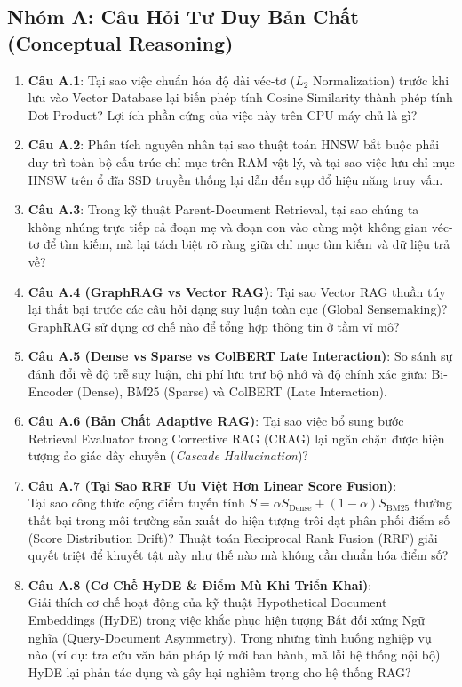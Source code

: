 \subsection{Nhóm A: Câu Hỏi Tư Duy Bản Chất (Conceptual Reasoning)}
\begin{enumerate}
  \item \textbf{Câu A.1}: Tại sao việc chuẩn hóa độ dài véc-tơ ($L_2$ Normalization) trước khi lưu vào Vector Database lại biến phép tính Cosine Similarity thành phép tính Dot Product? Lợi ích phần cứng của việc này trên CPU máy chủ là gì?
  \item \textbf{Câu A.2}: Phân tích nguyên nhân tại sao thuật toán HNSW bắt buộc phải duy trì toàn bộ cấu trúc chỉ mục trên RAM vật lý, và tại sao việc lưu chỉ mục HNSW trên ổ đĩa SSD truyền thống lại dẫn đến sụp đổ hiệu năng truy vấn.
  \item \textbf{Câu A.3}: Trong kỹ thuật Parent-Document Retrieval, tại sao chúng ta không nhúng trực tiếp cả đoạn mẹ và đoạn con vào cùng một không gian véc-tơ để tìm kiếm, mà lại tách biệt rõ ràng giữa chỉ mục tìm kiếm và dữ liệu trả về?
  \item \textbf{Câu A.4 (GraphRAG vs Vector RAG)}: Tại sao Vector RAG thuần túy lại thất bại trước các câu hỏi dạng suy luận toàn cục (Global Sensemaking)? GraphRAG sử dụng cơ chế nào để tổng hợp thông tin ở tầm vĩ mô?
  \item \textbf{Câu A.5 (Dense vs Sparse vs ColBERT Late Interaction)}: So sánh sự đánh đổi về độ trễ suy luận, chi phí lưu trữ bộ nhớ và độ chính xác giữa: Bi-Encoder (Dense), BM25 (Sparse) và ColBERT (Late Interaction).
  \item \textbf{Câu A.6 (Bản Chất Adaptive RAG)}: Tại sao việc bổ sung bước Retrieval Evaluator trong Corrective RAG (CRAG) lại ngăn chặn được hiện tượng ảo giác dây chuyền (\textit{Cascade Hallucination})?
  \item \textbf{Câu A.7 (Tại Sao RRF Ưu Việt Hơn Linear Score Fusion)}: \\
  Tại sao công thức cộng điểm tuyến tính $S = \alpha S_{\text{Dense}} + (1-\alpha) S_{\text{BM25}}$ thường thất bại trong môi trường sản xuất do hiện tượng trôi dạt phân phối điểm số (Score Distribution Drift)? Thuật toán Reciprocal Rank Fusion (RRF) giải quyết triệt để khuyết tật này như thế nào mà không cần chuẩn hóa điểm số?
  \item \textbf{Câu A.8 (Cơ Chế HyDE \& Điểm Mù Khi Triển Khai)}: \\
  Giải thích cơ chế hoạt động của kỹ thuật Hypothetical Document Embeddings (HyDE) trong việc khắc phục hiện tượng Bất đối xứng Ngữ nghĩa (Query-Document Asymmetry). Trong những tình huống nghiệp vụ nào (ví dụ: tra cứu văn bản pháp lý mới ban hành, mã lỗi hệ thống nội bộ) HyDE lại phản tác dụng và gây hại nghiêm trọng cho hệ thống RAG?

\end{enumerate}
